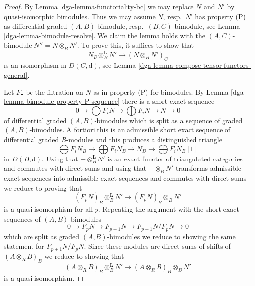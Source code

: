 \begin{proof}

By Lemma \ref{dga-lemma-functoriality-bc} we may replace $N$ and $N'$ by
quasi-isomorphic bimodules. Thus we may assume $N$, resp.\ $N'$
has property (P) as differential graded
$(A, B)$-bimodule, resp.\ $(B, C)$-bimodule, see
Lemma \ref{dga-lemma-bimodule-resolve}. We claim the lemma holds
with the $(A, C)$-bimodule $N'' = N \otimes_B N'$.
To prove this, it suffices to show that
$$
N_B \otimes_B^\mathbf{L} N' \longrightarrow (N \otimes_B N')_C
$$
is an isomorphism in $D(C, \text{d})$, see
Lemma \ref{dga-lemma-compose-tensor-functors-general}.

\medskip\noindent
Let $F_\bullet$ be the filtration on $N$ as in property (P) for bimodules.
By Lemma \ref{dga-lemma-bimodule-property-P-sequence}
there is a short exact sequence
$$
0 \to
\bigoplus\nolimits F_iN \to
\bigoplus\nolimits F_iN \to N \to 0
$$
of differential graded $(A, B)$-bimodules which is split as a sequence
of graded $(A, B)$-bimodules. A fortiori this is an admissible short exact
sequence of differential graded $B$-modules and this produces a distinguished
triangle
$$
\bigoplus\nolimits F_iN_B \to
\bigoplus\nolimits F_iN_B \to N_B \to
\bigoplus\nolimits F_iN_B[1]
$$
in $D(B, \text{d})$. Using that $- \otimes_B^\mathbf{L} N'$
is an exact functor of triangulated categories and commutes
with direct sums and using that $- \otimes_B N'$ transforms
admissible exact sequences into admissible exact sequences
and commutes with direct sums we reduce to proving
that
$$
(F_pN)_B \otimes_B^\mathbf{L} N' \longrightarrow (F_pN)_B \otimes_B N'
$$
is a quasi-isomorphism for all $p$. Repeating the argument
with the short exact sequences of $(A, B)$-bimodules
$$
0 \to F_pN \to F_{p + 1}N \to F_{p + 1}N/F_pN \to 0
$$
which are split as graded $(A, B)$-bimodules
we reduce to showing the same statement for $F_{p + 1}N/F_pN$.
Since these modules are direct sums of shifts of $(A \otimes_R B)_B$
we reduce to showing that
$$
(A \otimes_R B)_B \otimes_B^\mathbf{L} N'
\longrightarrow
(A \otimes_R B)_B \otimes_B N'
$$
is a quasi-isomorphism.


\end{proof}

